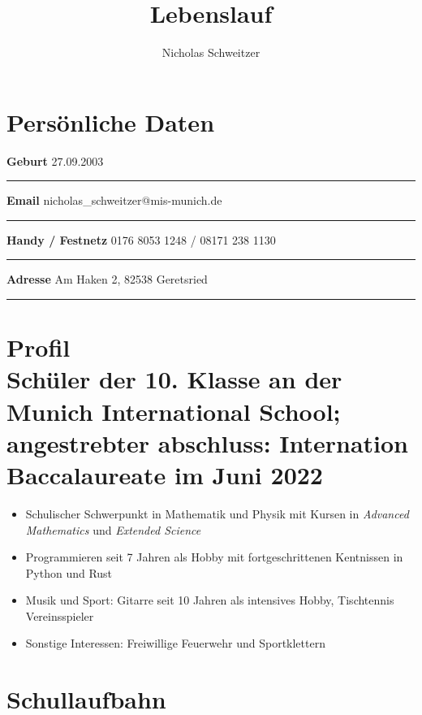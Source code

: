 \documentclass[12pt]{article}
\title{\vspace{-96pt} \Huge Lebenslauf}
\author{\Huge Nicholas Schweitzer \vspace{-32pt}}
\date{}
\newcommand{\sect}[1]{\vspace{-12pt}\section*{#1}\vspace{-12pt}}
\newcommand{\sep}{{\color{gray}\vspace{-12pt}\hrule}}
\begin{document}
\maketitle


\sect{Pers{\"o}nliche Daten}

\textbf{Geburt} \hfill{27.09.2003} \, \\
\sep
\textbf{Email} \hfill{nicholas\_schweitzer@mis-munich.de} \, \\
\sep
\textbf{Handy / Festnetz} \hfill{0176 8053 1248 / 08171 238 1130} \, \\
\sep
\textbf{Adresse} \hfill{Am Haken 2, 82538 Geretsried} \, \\
  \sep

  \sect{Profil \\
    Sch{\"u}ler der 10. Klasse an der Munich International School; angestrebter
    abschluss: Internation Baccalaureate im Juni 2022
  }
  \begin{itemize}
    \itemsep3pt

  \item Schulischer Schwerpunkt in Mathematik und Physik mit Kursen in \textit{\glqq
    Advanced Mathematics\grqq} und \textit{\glqq Extended Science\grqq}

  \item Programmieren seit 7 Jahren als Hobby mit fortgeschrittenen Kentnissen in
    Python und Rust

  \item Musik und Sport: Gitarre seit 10 Jahren als intensives Hobby,
    Tischtennis Vereinsspieler

  \item Sonstige Interessen: Freiwillige Feuerwehr und Sportklettern

  \end{itemize}
  \vspace{-12pt}

  \sect{Schullaufbahn}
\end{document}
